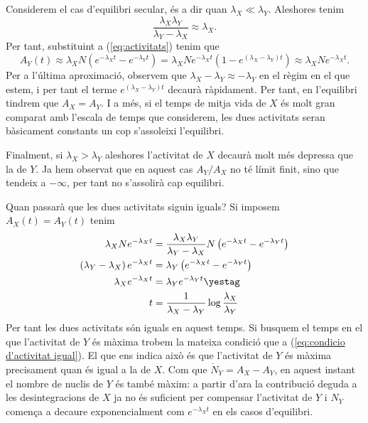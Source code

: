 \documentclass[12pt]{article}
\begin{document}
Considerem el cas d'equilibri secular, és a dir quan \( \lambda_X \ll \lambda_Y \). Aleshores tenim 
\begin{equation*}
	\frac{\lambda_X \lambda_Y}{\lambda_Y - \lambda_X} \approx \lambda_X.
\end{equation*}
Per tant, substituint a (\ref{eq:activitats}) tenim que 
\begin{equation*}
	A_Y(t) \approx \lambda_X N \left(e^{-\lambda_X t} - e^{-\lambda_Y t}\right) = \lambda_X N e^{-\lambda_X t} \left(1 - e^{(\lambda_X -\lambda_Y) t}\right) \approx \lambda_X N e^{-\lambda_X t}.
\end{equation*}
Per a l'última aproximació, observem que \( \lambda_X - \lambda_Y \approx -\lambda_Y \) en el règim en el que estem, i per tant el terme \( e^{(\lambda_X - \lambda_Y) t} \) decaurà ràpidament. Per tant, en l'equilibri tindrem que \( A_X = A_Y \). I a més, si el temps de mitja vida de \( X \) és molt gran comparat amb l'escala de temps que considerem, les dues activitats seran bàsicament constants un cop s'assoleixi l'equilibri.

Finalment, si \( \lambda_X > \lambda_Y \) aleshores l'activitat de \( X \) decaurà molt més depressa que la de \( Y \). Ja hem observat que en aquest cas \( A_Y/A_X \) no té límit finit, sino que tendeix a \( -\infty \), per tant no s'assolirà cap equilibri. 

Quan passarà que les dues activitats siguin iguals? Si imposem \( A_X(t) = A_Y(t) \) tenim
\begin{align*}
	\lambda_X N e^{-\lambda_X t} &= \frac{\lambda_X \lambda_Y}{\lambda_Y - \lambda_X}N\left(e^{-\lambda_X t} - e^{-\lambda_Y t}\right) \\
	\left(\lambda_Y - \lambda_X\right)e^{-\lambda_X t} &= \lambda_Y\left(e^{-\lambda_X t} - e^{-\lambda_Y t}\right) \\
	\lambda_X e^{-\lambda_X t} &= \lambda_Y e^{-\lambda_Y t} \yestag \label{eq:condicio d'activitat igual} \\
	t &= \frac{1}{\lambda_X - \lambda_Y}\log{\frac{\lambda_X}{\lambda_Y}}
\end{align*}
Per tant les dues activitats són iguals en aquest temps. Si busquem el temps en el que l'activitat de \( Y \) és màxima trobem la mateixa condició que a (\ref{eq:condicio d'activitat igual}). El que ens indica això és que l'activitat de \( Y \) és màxima precisament quan és igual a la de \( X \). Com que \( \dot{N}_Y = A_X - A_Y \), en aquest instant el nombre de nuclis de \( Y \) és també màxim: a partir d'ara la contribució deguda a les desintegracions de \( X \) ja no és suficient per compensar l'activitat de \( Y \) i \( N_Y \) comença a decaure exponencialment com \( e^{-\lambda_X t} \) en els casos d'equilibri.   
\end{document}
